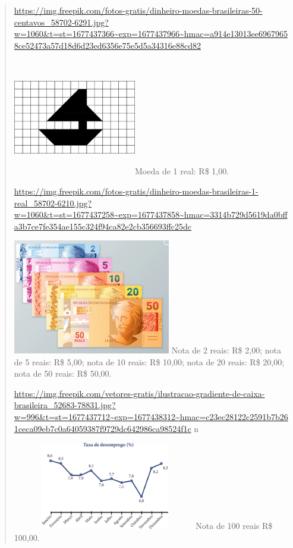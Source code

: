 \begin{mdframed}[linewidth=2pt,linecolor=salmao,roundcorner=2pt]
\begin{itemize}
{\begin{itemize}
\begin{escolha}
{\begin{quote}
{\url{https://img.freepik.com/fotos-gratis/dinheiro-moedas-brasileiras-50-centavos_58702-6291.jpg?w=1060\&t=st=1677437366~exp=1677437966~hmac=a914e13013ee69679658ce52473a57d18d6d23ed6356e75e5d5a34316e88cd82}

\includegraphics[width=2.11667in,height=2.01180in]{media/image77.png}Moeda
de 1 real: R\$ 1,00.

\url{https://img.freepik.com/fotos-gratis/dinheiro-moedas-brasileiras-1-real_58702-6210.jpg?w=1060\&t=st=1677437258~exp=1677437858~hmac=3314b729d5619da0bffa3b7ce7fe354ae155c324f94ca82e2cb356693ffc25dc}

\includegraphics[width=2.71068in,height=1.97500in]{media/image78.png}
Nota de 2 reais: R\$ 2,00; nota de 5 reais: R\$ 5,00; nota de 10 reais: R\$ 10,00; nota de 20 reais: R\$ 20,00; nota de 50 reais: R\$ 50,00.

\url{https://img.freepik.com/vetores-gratis/ilustracao-gradiente-de-caixa-brasileira_52683-78831.jpg?w=996\&t=st=1677437712~exp=1677438312~hmac=c23ec28122c2591b7b261ceca09eb7c0a64059387f9729dc642986ca98524f1c}
n

\includegraphics[width=3.18285in,height=1.50833in]{media/image79.png}Nota
de 100 reais R\$ 100,00.

}
\end{quote}}
\end{escolha}
\end{itemize}}
\end{itemize}
\end{mdframed}
